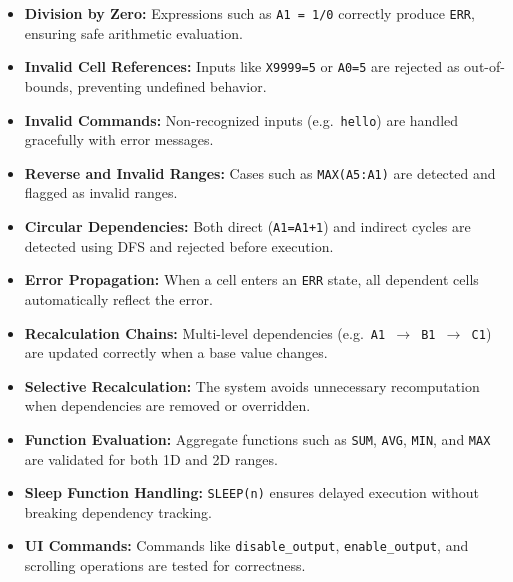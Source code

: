 \documentclass[11pt,a4paper]{article}
\begin{document}
\begin{itemize}
    \item \textbf{Division by Zero:} Expressions such as \texttt{A1 = 1/0} correctly produce \texttt{ERR}, ensuring safe arithmetic evaluation.
    
    \item \textbf{Invalid Cell References:} Inputs like \texttt{X9999=5} or \texttt{A0=5} are rejected as out-of-bounds, preventing undefined behavior.
    
    \item \textbf{Invalid Commands:} Non-recognized inputs (e.g.\ \texttt{hello}) are handled gracefully with error messages.
    
    \item \textbf{Reverse and Invalid Ranges:} Cases such as \texttt{MAX(A5:A1)} are detected and flagged as invalid ranges.
    
    \item \textbf{Circular Dependencies:} Both direct (\texttt{A1=A1+1}) and indirect cycles are detected using DFS and rejected before execution.
    
    \item \textbf{Error Propagation:} When a cell enters an \texttt{ERR} state, all dependent cells automatically reflect the error.
    
    \item \textbf{Recalculation Chains:} Multi-level dependencies (e.g.\ \texttt{A1 $\rightarrow$ B1 $\rightarrow$ C1}) are updated correctly when a base value changes.
    
    \item \textbf{Selective Recalculation:} The system avoids unnecessary recomputation when dependencies are removed or overridden.
    
    \item \textbf{Function Evaluation:} Aggregate functions such as \texttt{SUM}, \texttt{AVG}, \texttt{MIN}, and \texttt{MAX} are validated for both 1D and 2D ranges.
    
    \item \textbf{Sleep Function Handling:} \texttt{SLEEP(n)} ensures delayed execution without breaking dependency tracking.
    
    \item \textbf{UI Commands:} Commands like \texttt{disable\_output}, \texttt{enable\_output}, and scrolling operations are tested for correctness.
\end{itemize}
\end{document}
